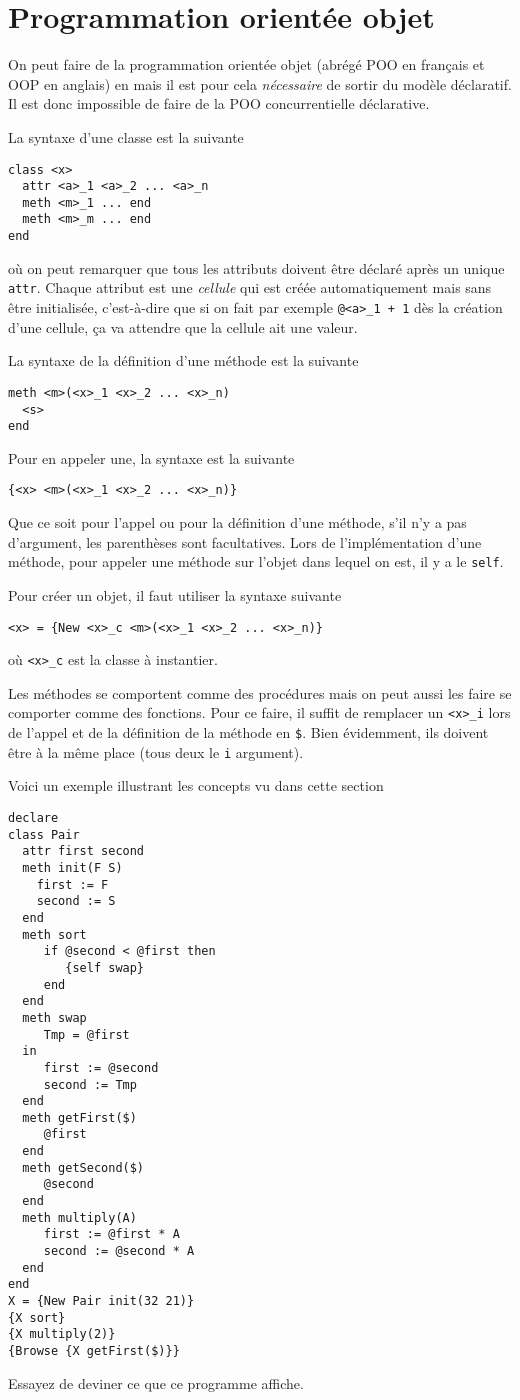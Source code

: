 \section{Programmation orientée objet}
On peut faire de la programmation orientée objet
(abrégé POO en français et OOP en anglais) en \oz{} mais il
est pour cela \emph{nécessaire} de sortir du modèle déclaratif.
Il est donc impossible de faire de la POO concurrentielle déclarative.

La syntaxe d'une classe est la suivante
\begin{lstlisting}
class <x>
  attr <a>_1 <a>_2 ... <a>_n
  meth <m>_1 ... end
  meth <m>_m ... end
end
\end{lstlisting}
où on peut remarquer que tous les attributs doivent être déclaré
après un unique \keyword{} \lstinline|attr|.
Chaque attribut est une \emph{cellule} qui est créée automatiquement
mais sans être initialisée, c'est-à-dire que si on fait par exemple
\lstinline|@<a>_1 + 1| dès la création d'une cellule, ça va attendre
que la cellule ait une valeur.

La syntaxe de la définition d'une méthode est la suivante
\begin{lstlisting}
meth <m>(<x>_1 <x>_2 ... <x>_n)
  <s>
end
\end{lstlisting}

Pour en appeler une, la syntaxe est la suivante
\begin{lstlisting}
{<x> <m>(<x>_1 <x>_2 ... <x>_n)}
\end{lstlisting}
Que ce soit pour l'appel ou pour la définition d'une méthode,
s'il n'y a pas d'argument, les parenthèses sont facultatives.
Lors de l'implémentation d'une méthode,
pour appeler une méthode sur l'objet dans lequel on est,
il y a le \keyword{} \lstinline|self|.

Pour créer un objet, il faut utiliser la syntaxe suivante
\begin{lstlisting}
<x> = {New <x>_c <m>(<x>_1 <x>_2 ... <x>_n)}
\end{lstlisting}
où \lstinline|<x>_c| est la classe à instantier.

Les méthodes se comportent comme des procédures mais on peut aussi les
faire se comporter comme des fonctions.
Pour ce faire, il suffit de remplacer un \lstinline|<x>_i| lors de l'appel
et de la définition de la méthode en \lstinline|$|.
Bien évidemment, ils doivent être à la même place
(tous deux le \lstinline|i|\ieme{} argument).

Voici un exemple illustrant les concepts vu dans cette section
\begin{lstlisting}
declare
class Pair
  attr first second
  meth init(F S)
    first := F
    second := S
  end
  meth sort
     if @second < @first then
        {self swap}
     end
  end
  meth swap
     Tmp = @first
  in
     first := @second
     second := Tmp
  end
  meth getFirst($)
     @first
  end
  meth getSecond($)
     @second
  end
  meth multiply(A)
     first := @first * A
     second := @second * A
  end
end
X = {New Pair init(32 21)}
{X sort}
{X multiply(2)}
{Browse {X getFirst($)}}
\end{lstlisting}
Essayez de deviner ce que ce programme affiche.

